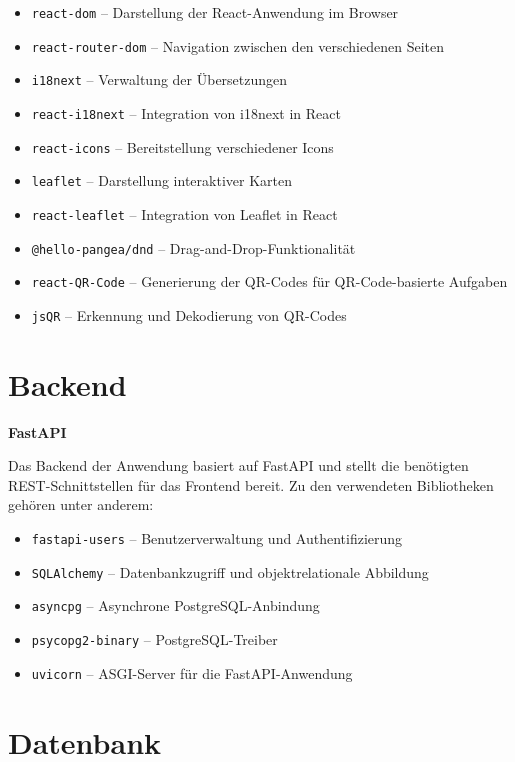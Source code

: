 ﻿\documentclass[oneside]{ausarbeitung}
\begin{document}
\begin{itemize}
    \item \texttt{react-dom} -- Darstellung der React-Anwendung im Browser
    \item \texttt{react-router-dom} -- Navigation zwischen den verschiedenen Seiten
    \item \texttt{i18next} -- Verwaltung der Übersetzungen
    \item \texttt{react-i18next} -- Integration von i18next in React
    \item \texttt{react-icons} -- Bereitstellung verschiedener Icons
    \item \texttt{leaflet} -- Darstellung interaktiver Karten
    \item \texttt{react-leaflet} -- Integration von Leaflet in React
    \item \texttt{@hello-pangea/dnd} -- Drag-and-Drop-Funktionalität
    \item \texttt{react-QR-Code} -- Generierung der QR-Codes für QR-Code-basierte Aufgaben
    \item \texttt{jsQR} -- Erkennung und Dekodierung von QR-Codes
\end{itemize}


\section{Backend}

\textbf{FastAPI}

Das Backend der Anwendung basiert auf FastAPI und stellt die benötigten REST-Schnittstellen für das Frontend bereit.
Zu den verwendeten Bibliotheken gehören unter anderem:

\begin{itemize}
    \item \texttt{fastapi-users} -- Benutzerverwaltung und Authentifizierung
    \item \texttt{SQLAlchemy} -- Datenbankzugriff und objektrelationale Abbildung
    \item \texttt{asyncpg} -- Asynchrone PostgreSQL-Anbindung
    \item \texttt{psycopg2-binary} -- PostgreSQL-Treiber
    \item \texttt{uvicorn} -- ASGI-Server für die FastAPI-Anwendung
\end{itemize}


\section{Datenbank}
\end{document}

